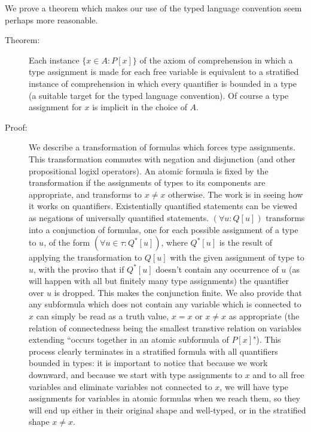 \documentclass[12pt]{book}
\begin{document}
We prove a theorem which makes our use of the typed language convention seem perhaps more reasonable.

\begin{description}

\item[Theorem:]  Each instance $\{x \in A:P[x]\}$ of the axiom of comprehension in which a type assignment is made for each free variable is equivalent to a stratified instance of comprehension in which every quantifier is bounded in a type (a suitable target for the typed language convention).   Of course a type assignment for $x$ is implicit in the choice of $A$.

\item[Proof:]  We describe a transformation of formulas which forces type assignments.  This transformation commutes with negation and disjunction (and other propositional logixl operators).
An atomic formula is fixed by the transformation if the assignments of types to its components are appropriate, and transforms to $x \neq x$ otherwise.
The work is in seeing how it works on quantifiers.   Existentially quantified statements can be viewed as negations of universally quantified statements.  $(\forall u:Q[u])$ transforms into a conjunction of formulas, one for each possible assignment of a type to $u$,
of the form $(\forall u \in \tau:Q^*[u])$, where $Q^*[u]$ is the result of applying the transformation to $Q[u]$ with the given assignment of type to $u$, with the proviso
that if $Q^*[u]$ doesn't contain any occurrence of $u$ (as will happen with all but finitely many type assignments) the quantifier over $u$ is dropped.  This makes the conjunction finite.  We also provide that any subformula which does not contain any variable which is connected to $x$ can simply be read as a truth value, $x=x$ or $x \neq x$ as appropriate  (the relation of connectedness being the smallest transtive relation on variables  extending ``occurs together in an atomic subformula of $P[x]$").   This process clearly terminates in a stratified formula with all quantifiers bounded in types:  it is important to notice that because we work downward, and because we start with type assignments to $x$ and to all free variables and eliminate variables not connected to $x$, we will have type assignments for variables in atomic formulas when we reach them, so they will end up either in their original shape and well-typed, or in the stratified shape $x \neq x$.

\end{description}
\end{document}
